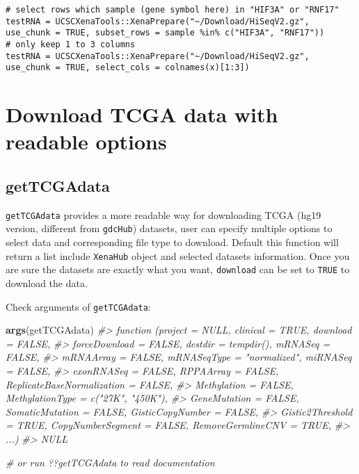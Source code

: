 \documentclass[nofonts,]{tufte-handout}
\newenvironment{Shaded}{\begin{snugshade}}{\end{snugshade}}
\newcommand{\CommentTok}[1]{\textcolor[rgb]{0.56,0.35,0.01}{\textit{#1}}}
\newcommand{\KeywordTok}[1]{\textcolor[rgb]{0.13,0.29,0.53}{\textbf{#1}}}
\newcommand{\NormalTok}[1]{#1}
\begin{document}
\begin{verbatim}
# select rows which sample (gene symbol here) in "HIF3A" or "RNF17"
testRNA = UCSCXenaTools::XenaPrepare("~/Download/HiSeqV2.gz", use_chunk = TRUE, subset_rows = sample %in% c("HIF3A", "RNF17"))
# only keep 1 to 3 columns
testRNA = UCSCXenaTools::XenaPrepare("~/Download/HiSeqV2.gz", use_chunk = TRUE, select_cols = colnames(x)[1:3])
\end{verbatim}

\hypertarget{download-tcga-data-with-readable-options}{%
\section{Download TCGA data with readable
options}\label{download-tcga-data-with-readable-options}}

\hypertarget{gettcgadata}{%
\subsection{getTCGAdata}\label{gettcgadata}}

\texttt{getTCGAdata} provides a more readable way for downloading TCGA
(hg19 version, different from \texttt{gdcHub}) datasets, user can
specify multiple options to select data and corresponding file type to
download. Default this function will return a list include
\texttt{XenaHub} object and selected datasets information. Once you are
sure the datasets are exactly what you want, \texttt{download} can be
set to \texttt{TRUE} to download the data.

Check arguments of \texttt{getTCGAdata}:

\begin{Shaded}
\begin{Highlighting}[]
\KeywordTok{args}\NormalTok{(getTCGAdata)}
\CommentTok{#> function (project = NULL, clinical = TRUE, download = FALSE, }
\CommentTok{#>     forceDownload = FALSE, destdir = tempdir(), mRNASeq = FALSE, }
\CommentTok{#>     mRNAArray = FALSE, mRNASeqType = "normalized", miRNASeq = FALSE, }
\CommentTok{#>     exonRNASeq = FALSE, RPPAArray = FALSE, ReplicateBaseNormalization = FALSE, }
\CommentTok{#>     Methylation = FALSE, MethylationType = c("27K", "450K"), }
\CommentTok{#>     GeneMutation = FALSE, SomaticMutation = FALSE, GisticCopyNumber = FALSE, }
\CommentTok{#>     Gistic2Threshold = TRUE, CopyNumberSegment = FALSE, RemoveGermlineCNV = TRUE, }
\CommentTok{#>     ...) }
\CommentTok{#> NULL}

\CommentTok{# or run ??getTCGAdata to read documentation}
\end{Highlighting}
\end{Shaded}
\end{document}

